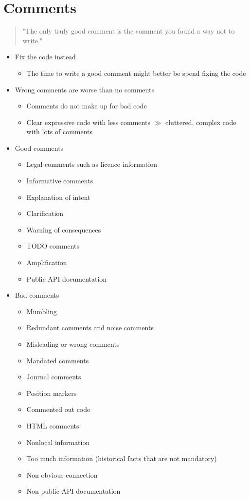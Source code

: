 \section{Comments}
\begin{quote}
    "The only truly good comment is the comment you found a way not to write."
\end{quote}
\begin{itemize}
    \item Fix the code instead
    \begin{itemize}
        \item The time to write a good comment might better be spend fixing the code
    \end{itemize}
    \item Wrong comments are worse than no comments
    \begin{itemize}
        \item Comments do not make up for bad code
        \item Clear expressive code with less comments $\gg$ cluttered, complex code with lots of comments
    \end{itemize}
    \item Good comments
    \begin{itemize}
        \item Legal comments such as licence information
        \item Informative comments
        \item Explanation of intent
        \item Clarification
        \item Warning of consequences
        \item TODO comments
        \item Amplification
        \item Public API documentation
    \end{itemize}
    \item Bad comments
    \begin{itemize}
        \item Mumbling
        \item Redundant comments and noise comments
        \item Misleading or wrong comments
        \item Mandated comments
        \item Journal comments
        \item Position markers
        \item Commented out code
        \item HTML comments
        \item Nonlocal information
        \item Too much information (historical facts that are not mandatory)
        \item Non obvious connection
        \item Non public API documentation
    \end{itemize}
\end{itemize}
